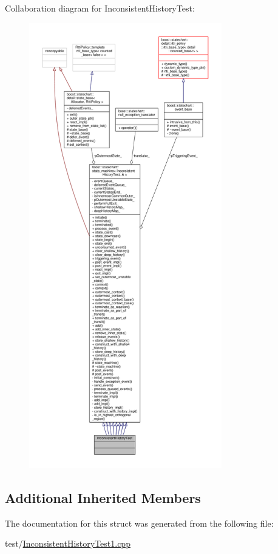 Collaboration diagram for Inconsistent\+History\+Test\+:
\nopagebreak
\begin{figure}[H]
\begin{center}
\leavevmode
\includegraphics[height=550pt]{struct_inconsistent_history_test__coll__graph}
\end{center}
\end{figure}
\subsection*{Additional Inherited Members}


The documentation for this struct was generated from the following file\+:\begin{DoxyCompactItemize}
\item 
test/\mbox{\hyperlink{_inconsistent_history_test1_8cpp}{Inconsistent\+History\+Test1.\+cpp}}\end{DoxyCompactItemize}
